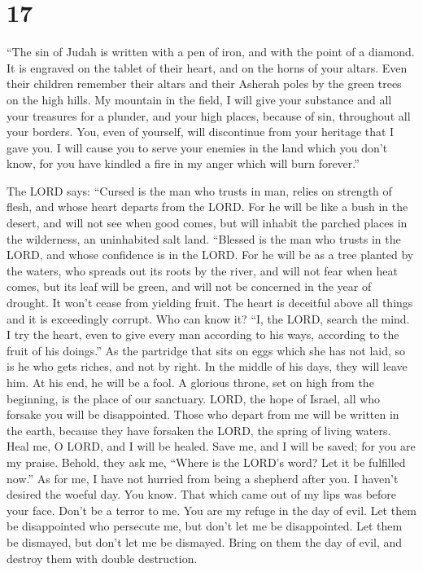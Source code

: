 \hypertarget{section-16}{%
\section{17}\label{section-16}}

 ``The sin of Judah is written with a pen of iron, and with
the point of a diamond. It is engraved on the tablet of their heart, and
on the horns of your altars.  Even their children remember
their altars and their Asherah poles by the green trees on the high
hills.  My mountain in the field, I will give your substance
and all your treasures for a plunder, and your high places, because of
sin, throughout all your borders.  You, even of yourself,
will discontinue from your heritage that I gave you. I will cause you to
serve your enemies in the land which you don't know, for you have
kindled a fire in my anger which will burn forever.''

 The LORD says: ``Cursed is the man who trusts in man,
relies on strength of flesh, and whose heart departs from the LORD.
 For he will be like a bush in the desert, and will not see
when good comes, but will inhabit the parched places in the wilderness,
an uninhabited salt land.  ``Blessed is the man who trusts
in the LORD, and whose confidence is in the LORD.  For he
will be as a tree planted by the waters, who spreads out its roots by
the river, and will not fear when heat comes, but its leaf will be
green, and will not be concerned in the year of drought. It won't cease
from yielding fruit.  The heart is deceitful above all
things and it is exceedingly corrupt. Who can know it? 
``I, the LORD, search the mind. I try the heart, even to give every man
according to his ways, according to the fruit of his doings.''
 As the partridge that sits on eggs which she has not laid,
so is he who gets riches, and not by right. In the middle of his days,
they will leave him. At his end, he will be a fool.  A
glorious throne, set on high from the beginning, is the place of our
sanctuary.  LORD, the hope of Israel, all who forsake you
will be disappointed. Those who depart from me will be written in the
earth, because they have forsaken the LORD, the spring of living waters.
 Heal me, O LORD, and I will be healed. Save me, and I will
be saved; for you are my praise.  Behold, they ask me,
``Where is the LORD's word? Let it be fulfilled now.''  As
for me, I have not hurried from being a shepherd after you. I haven't
desired the woeful day. You know. That which came out of my lips was
before your face.  Don't be a terror to me. You are my
refuge in the day of evil.  Let them be disappointed who
persecute me, but don't let me be disappointed. Let them be dismayed,
but don't let me be dismayed. Bring on them the day of evil, and destroy
them with double destruction.

